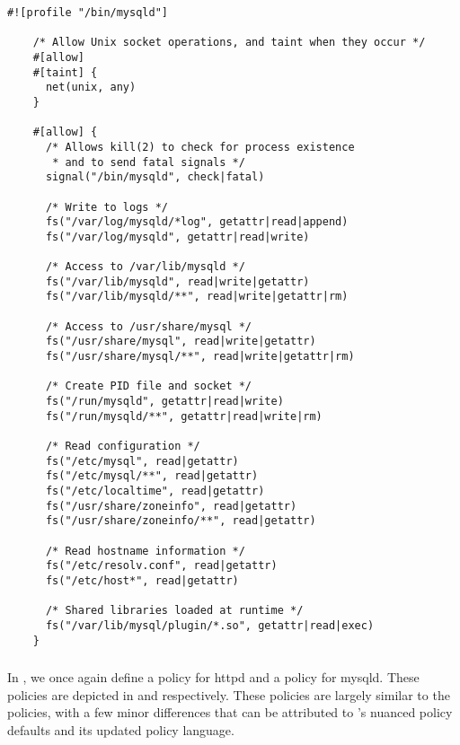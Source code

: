 \clearpage

\begin{lstlisting}[language=bpfbox, gobble=4, float=false, caption={[A \bpfbox{} policy for MySQL]
  A \bpfbox{} policy for MySQL.
  %\todo{Describe this}
}, label={lst:bpfbox-mysql}]
    #![profile "/bin/mysqld"]

    /* Allow Unix socket operations, and taint when they occur */
    #[allow]
    #[taint] {
      net(unix, any)
    }

    #[allow] {
      /* Allows kill(2) to check for process existence
       * and to send fatal signals */
      signal("/bin/mysqld", check|fatal)

      /* Write to logs */
      fs("/var/log/mysqld/*log", getattr|read|append)
      fs("/var/log/mysqld", getattr|read|write)

      /* Access to /var/lib/mysqld */
      fs("/var/lib/mysqld", read|write|getattr)
      fs("/var/lib/mysqld/**", read|write|getattr|rm)

      /* Access to /usr/share/mysql */
      fs("/usr/share/mysql", read|write|getattr)
      fs("/usr/share/mysql/**", read|write|getattr|rm)

      /* Create PID file and socket */
      fs("/run/mysqld", getattr|read|write)
      fs("/run/mysqld/**", getattr|read|write|rm)

      /* Read configuration */
      fs("/etc/mysql", read|getattr)
      fs("/etc/mysql/**", read|getattr)
      fs("/etc/localtime", read|getattr)
      fs("/usr/share/zoneinfo", read|getattr)
      fs("/usr/share/zoneinfo/**", read|getattr)

      /* Read hostname information */
      fs("/etc/resolv.conf", read|getattr)
      fs("/etc/host*", read|getattr)

      /* Shared libraries loaded at runtime */
      fs("/var/lib/mysql/plugin/*.so", getattr|read|exec)
    }
\end{lstlisting}

\subsubsection{\bpfcontain{}}

In \bpfcontain{}, we once again define a policy for httpd and a policy for mysqld.  These
policies are depicted in  and 
respectively. These policies are largely similar to the \bpfbox{} policies, with a few
minor differences that can be attributed to \bpfcontain{}'s nuanced policy defaults and
its updated policy language.

